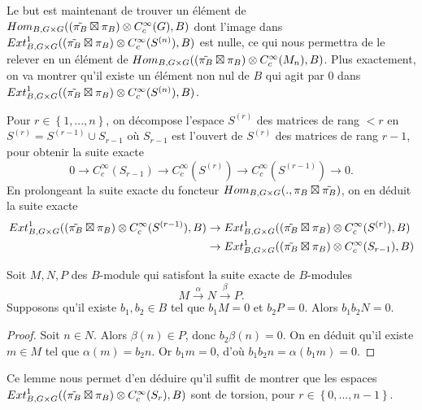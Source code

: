 Le but est maintenant de trouver un élément de $\operatorname{\mathnormal{Hom}}_{B, G \times G}((\tilde{\pi_B} \boxtimes \pi_B) \otimes C^\infty_c(G), B)$ dont l'image dans $\operatorname{\mathnormal{Ext}}^1_{B, G \times G}((\tilde{\pi_B} \boxtimes \pi_B) \otimes C^\infty_c(S^{(n)}), B)$ est nulle, ce qui nous permettra de le relever en un élément de $\operatorname{\mathnormal{Hom}}_{B, G \times G}((\tilde{\pi_B} \boxtimes \pi_B) \otimes C^\infty_c(M_n), B)$. Plus exactement, on va montrer qu'il existe un élément non nul de $B$ qui agit par $0$ dans $\operatorname{\mathnormal{Ext}}^1_{B, G \times G}((\tilde{\pi_B} \boxtimes \pi_B) \otimes C^\infty_c(S^{(n)}), B)$.

Pour $r \in \left\lbrace 1, ..., n \right\rbrace$, on décompose l'espace $S^{(r)}$ des matrices de rang $< r$ en $S^{(r)}=S^{(r-1)} \cup S_{r-1}$ où $S_{r-1}$ est l'ouvert de $S^{(r)}$ des matrices de rang $r-1$, pour obtenir la suite exacte
\begin{equation}
0 \rightarrow C^\infty_c(S_{r-1}) \rightarrow C^\infty_c(S^{(r)}) \rightarrow C^\infty_c(S^{(r-1)}) \rightarrow 0.
\end{equation}
En prolongeant la suite exacte du foncteur $\operatorname{\mathnormal{Hom}}_{B, G \times G} (., \pi_B \boxtimes \tilde{\pi_B})$, on en déduit la suite exacte
\begin{equation}
\begin{split}
\operatorname{\mathnormal{Ext}}^1_{B, G \times G}((\tilde{\pi_B} \boxtimes \pi_B) \otimes C^\infty_c(S^{(r-1)}), B) &\rightarrow \operatorname{\mathnormal{Ext}}^1_{B, G \times G}((\tilde{\pi_B} \boxtimes \pi_B) \otimes C^\infty_c(S^{(r)}), B) \\ 
&\rightarrow \operatorname{\mathnormal{Ext}}^1_{B, G \times G}((\tilde{\pi_B} \boxtimes \pi_B) \otimes C^\infty_c(S_{r-1}), B)
\end{split}
\end{equation}

\begin{lemme}
Soit $M,N,P$ des $B$-module qui satisfont la suite exacte de $B$-modules
\begin{equation}
M \xrightarrow{\alpha} N \xrightarrow{\beta} P.
\end{equation}
Supposons qu'il existe $b_1, b_2 \in B$ tel que $b_1M = 0$ et $b_2P=0$. Alors $b_1b_2N=0$.
\end{lemme}

\begin{proof}
Soit $n \in N$. Alors $\beta(n) \in P$, donc $b_2\beta(n)=0$. On en déduit qu'il existe $m \in M$ tel que $\alpha(m)=b_2n$. Or $b_1m=0$, d'où $b_1b_2n=\alpha(b_1m)=0$.
\end{proof}

Ce lemme nous permet d'en déduire qu'il suffit de montrer que les espaces $\operatorname{\mathnormal{Ext}}^1_{B, G \times G}((\tilde{\pi_B} \boxtimes \pi_B) \otimes C^\infty_c(S_r), B)$ sont de torsion, pour $r \in \left\lbrace 0, ..., n-1 \right\rbrace$.

